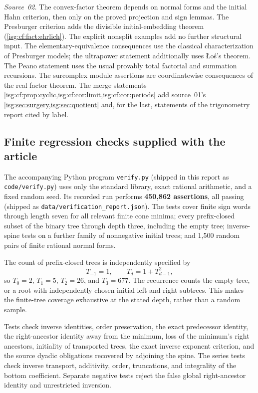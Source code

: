 \documentclass[11pt]{article}
\theoremstyle{definition}
\theoremstyle{remark}
\newcommand{\fn}[1]{\nolinkurl{#1}}
\begin{document}
\emph{Source~02.} The convex-factor theorem depends on normal forms and
the initial Hahn criterion, then only on the proved projection and sign
lemmas. The Presburger criterion adds the divisible initial-embedding
theorem (\cref{isg:cf:fact:ehrlich}). The explicit nonsplit examples add
no further structural input. The elementary-equivalence consequences use
the classical characterization of Presburger models; the ultrapower
statement additionally uses \L o\'s's theorem. The Peano statement uses
the usual provably total factorial and summation recursions. The
surcomplex module assertions are coordinatewise consequences of the real
factor theorem. The merge statements
\cref{isg:cf:prop:cyclic,isg:cf:cor:limit,isg:cf:cor:periods} add
source~01's \cref{isg:sec:surgery,isg:sec:quotient} and, for the last,
statements of the trigonometry report cited by label.

\subsection{Finite regression checks supplied with the article}
The accompanying Python program \texttt{verify.py} (shipped in this
report as \fn{code/verify.py}) uses only the standard
library, exact rational arithmetic, and a fixed random seed. Its recorded
run performs \textbf{450,862 assertions}, all passing (shipped as
\fn{data/verification_report.json}). The tests cover
finite sign words through length seven for all relevant finite cone
minima; every prefix-closed subset of the binary tree through depth
three, including the empty tree; inverse-spine tests on a further family
of nonnegative initial trees; and 1,500 random pairs of finite rational
normal forms.

The count of prefix-closed trees is independently specified by
\[
 T_{-1}=1,\qquad T_d=1+T_{d-1}^2,
\]
so $T_0=2$, $T_1=5$, $T_2=26$, and $T_3=677$.
The recurrence counts the empty tree, or a root with independently
chosen initial left and right subtrees. This makes the finite-tree
coverage exhaustive at the stated depth, rather than a random sample.

Tests check inverse identities, order preservation, the exact predecessor
identity, the right-ancestor
identity away from the minimum, loss of the minimum's right ancestors,
initiality of transported trees, the exact inverse exponent criterion,
and the source dyadic obligations recovered by adjoining the spine.
The series tests check inverse transport, additivity, order, truncations,
and integrality of the bottom coefficient. Separate negative tests reject
the false global right-ancestor identity and unrestricted inversion.
\end{document}
